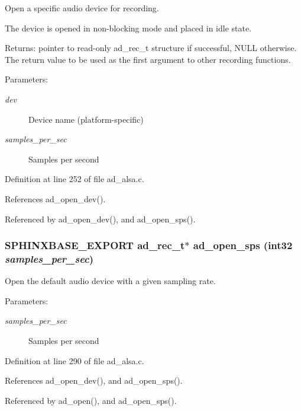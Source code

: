 Open a specific audio device for recording. 

The device is opened in non-blocking mode and placed in idle state.

\begin{Desc}
\item[Returns:]pointer to read-only ad\_\-rec\_\-t structure if successful, NULL otherwise. The return value to be used as the first argument to other recording functions. \end{Desc}
\begin{Desc}
\item[Parameters: ]\par
\begin{description}
\item[{\em 
dev}]Device name (platform-specific) \item[{\em 
samples\_\-per\_\-sec}]Samples per second \end{description}
\end{Desc}


Definition at line 252 of file ad\_\-alsa.c.

References ad\_\-open\_\-dev().

Referenced by ad\_\-open\_\-dev(), and ad\_\-open\_\-sps().
\subsubsection[{ad\_\-open\_\-sps}]{\setlength{\rightskip}{0pt plus 5cm}SPHINXBASE\_\-EXPORT ad\_\-rec\_\-t$\ast$ ad\_\-open\_\-sps (int32 {\em samples\_\-per\_\-sec})}\label{ad_8h_71b4eec805fbe5c398ea0897816de6f0}


Open the default audio device with a given sampling rate. 

\begin{Desc}
\item[Parameters: ]\par
\begin{description}
\item[{\em 
samples\_\-per\_\-sec}]Samples per second \end{description}
\end{Desc}


Definition at line 290 of file ad\_\-alsa.c.

References ad\_\-open\_\-dev(), and ad\_\-open\_\-sps().

Referenced by ad\_\-open(), and ad\_\-open\_\-sps().
